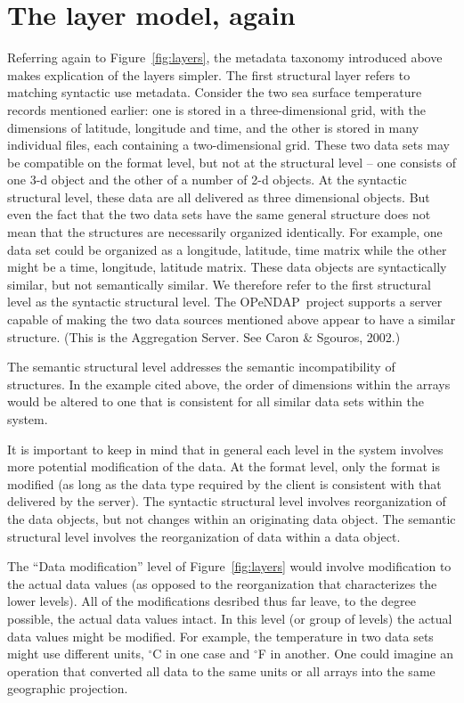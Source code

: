 \documentclass{codata}
\newcommand{\opendap}{\ac{OPeNDAP}}
\begin{document}
\section{The layer model, again}

Referring again to Figure~\ref{fig:layers}, the metadata taxonomy
introduced above makes explication of the layers simpler.  The first
structural layer refers to matching syntactic use metadata.  Consider
the two sea surface temperature records mentioned earlier: one is
stored in a three-dimensional grid, with the dimensions of latitude,
longitude and time, and the other is stored in many individual files,
each containing a two-dimensional grid.  These two data sets may be
compatible on the format level, but not at the structural level -- one
consists of one 3-d object and the other of a number of 2-d objects. 
At the syntactic structural level, these data are all delivered as
three dimensional objects. But even the fact that the two data sets have 
the same general structure does not mean that the structures are 
necessarily organized identically. For example, one data set could
be organized as a longitude, latitude, time matrix while the other
might be a time, longitude, latitude matrix. These data objects
are syntactically similar, but not semantically similar. We therefore
refer to the first structural level as the syntactic structural level.
The \opendap\ project supports a server capable of making the two data
sources mentioned above appear to have a similar structure.  (This is 
the Aggregation Server.  See Caron \& Sgouros, 2002.) 

The semantic structural level addresses the semantic incompatibility 
of structures. In the example cited above, the order of dimensions
within the arrays would be altered to one that is consistent for all
similar data sets within the system. 

It is important to keep in mind
that in general each level in the system involves more potential 
modification of the data. At the format level, only the format is
modified (as long as the data type required by the client is
consistent with that delivered by the server). The syntactic
structural level involves reorganization of the data objects,
but not changes within an originating data object. The semantic
structural level involves the reorganization of data within a
data object.

The ``Data modification'' level of  
Figure~\ref{fig:layers} would involve modification 
to the actual data values (as opposed to the reorganization that
characterizes the lower levels). All of the modifications desribed thus
far leave, to the degree possible, the actual data values intact.
In this level (or group of levels) the actual data values might
be modified. For example, the temperature in two data sets might use different
units, $^\circ$C in one case and $^\circ$F in another. One could
imagine an operation that converted all data to the same units or
all arrays into the same geographic projection. 
\end{document}
